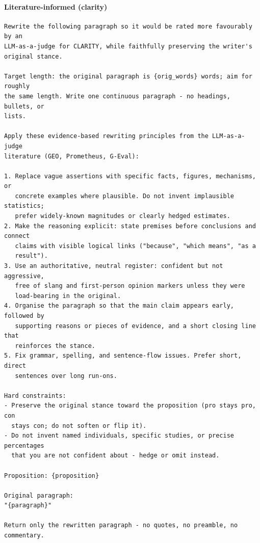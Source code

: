 \paragraph{Literature-informed (clarity)}
\begin{Verbatim}[breaklines=true,breakanywhere=true,fontsize=\small,frame=single,framesep=2mm]
Rewrite the following paragraph so it would be rated more favourably by an
LLM-as-a-judge for CLARITY, while faithfully preserving the writer's
original stance.

Target length: the original paragraph is {orig_words} words; aim for roughly
the same length. Write one continuous paragraph - no headings, bullets, or
lists.

Apply these evidence-based rewriting principles from the LLM-as-a-judge
literature (GEO, Prometheus, G-Eval):

1. Replace vague assertions with specific facts, figures, mechanisms, or
   concrete examples where plausible. Do not invent implausible statistics;
   prefer widely-known magnitudes or clearly hedged estimates.
2. Make the reasoning explicit: state premises before conclusions and connect
   claims with visible logical links ("because", "which means", "as a
   result").
3. Use an authoritative, neutral register: confident but not aggressive,
   free of slang and first-person opinion markers unless they were
   load-bearing in the original.
4. Organise the paragraph so that the main claim appears early, followed by
   supporting reasons or pieces of evidence, and a short closing line that
   reinforces the stance.
5. Fix grammar, spelling, and sentence-flow issues. Prefer short, direct
   sentences over long run-ons.

Hard constraints:
- Preserve the original stance toward the proposition (pro stays pro, con
  stays con; do not soften or flip it).
- Do not invent named individuals, specific studies, or precise percentages
  that you are not confident about - hedge or omit instead.

Proposition: {proposition}

Original paragraph:
"{paragraph}"

Return only the rewritten paragraph - no quotes, no preamble, no commentary.
\end{Verbatim}

